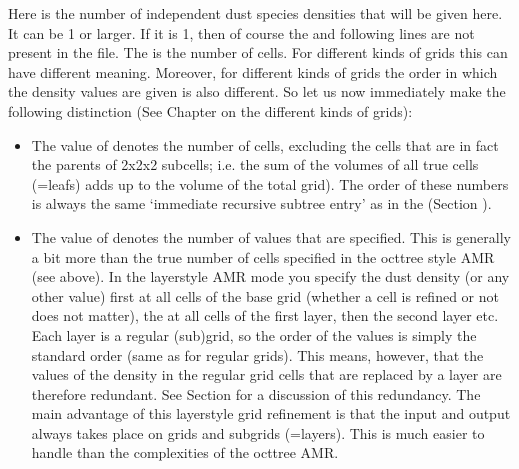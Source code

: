 \documentclass[letterpaper,10pt,english]{sphinxmanual}
\begin{document}
Here  is the number of independent dust species densities
that will be given here. It can be 1 or larger. If it is 1, then of course
the  and following lines are not present
in the file. The  is the number of cells. For different
kinds of grids this can have different meaning. Moreover, for different
kinds of grids the order in which the density values are given is also
different.  So let us now immediately make the following distinction (See
Chapter {\hyperref[\detokenize{gridding:chap-gridding}]{}} on the different kinds of grids):
\begin{itemize}
\item {} 

The value of  denotes the number of  cells,
excluding the cells that are in fact the parents of 2x2x2 subcells; i.e.
the sum of the volumes of all true cells (=leafs) adds up to the volume of
the total grid). The order of these numbers is always the same ‘immediate
recursive subtree entry’ as in the 
(Section {\hyperref[\detokenize{inputoutputfiles:sec-grid-input}]{}}).

\item {} 

The value of  denotes the number of values that are specified. This
is generally a bit more than the true number of cells specified in the
oct\sphinxhyphen{}tree style AMR (see above). In the layer\sphinxhyphen{}style AMR mode you specify the
dust density (or any other value) first at all cells of the base grid (whether
a cell is refined or not does not matter), the at all cells of the first
layer, then the second layer etc. Each layer is a regular (sub\sphinxhyphen{})grid, so the
order of the values is simply the standard order (same as for regular
grids). This means, however, that the values of the density in the regular
grid cells that are replaced by a layer are therefore redundant. See Section
{\hyperref[\detokenize{gridding:sec-layer-amr-redundancy}]{}} for a discussion of this redundancy. The main
advantage of this layer\sphinxhyphen{}style grid refinement is that the input and output
always takes place on  grids and subgrids (=layers). This is much
easier to handle than the complexities of the oct\sphinxhyphen{}tree AMR.

\end{itemize}
\end{document}
